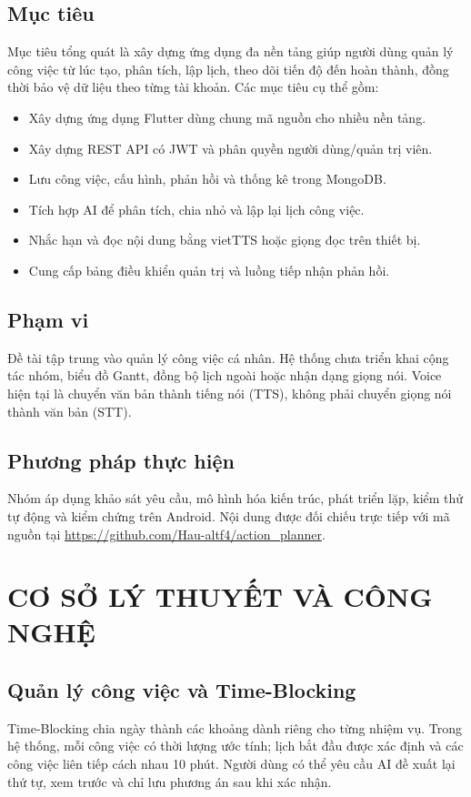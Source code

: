 \documentclass[12pt,a4paper,oneside]{report}
\begin{document}
\section{Mục tiêu}
Mục tiêu tổng quát là xây dựng ứng dụng đa nền tảng giúp người dùng quản lý công việc
từ lúc tạo, phân tích, lập lịch, theo dõi tiến độ đến hoàn thành, đồng thời bảo vệ dữ liệu
theo từng tài khoản. Các mục tiêu cụ thể gồm:
\begin{itemize}
 \item Xây dựng ứng dụng Flutter dùng chung mã nguồn cho nhiều nền tảng.
 \item Xây dựng REST API có JWT và phân quyền người dùng/quản trị viên.
 \item Lưu công việc, cấu hình, phản hồi và thống kê trong MongoDB.
 \item Tích hợp AI để phân tích, chia nhỏ và lập lại lịch công việc.
 \item Nhắc hạn và đọc nội dung bằng vietTTS hoặc giọng đọc trên thiết bị.
 \item Cung cấp bảng điều khiển quản trị và luồng tiếp nhận phản hồi.
\end{itemize}

\section{Phạm vi}
Đề tài tập trung vào quản lý công việc cá nhân. Hệ thống chưa triển khai cộng tác nhóm,
biểu đồ Gantt, đồng bộ lịch ngoài hoặc nhận dạng giọng nói. Voice hiện tại là chuyển văn
bản thành tiếng nói (TTS), không phải chuyển giọng nói thành văn bản (STT).

\section{Phương pháp thực hiện}
Nhóm áp dụng khảo sát yêu cầu, mô hình hóa kiến trúc, phát triển lặp, kiểm thử tự động
và kiểm chứng trên Android. Nội dung được đối chiếu trực tiếp với mã nguồn tại
\url{https://github.com/Hau-altf4/action_planner}.

\chapter{CƠ SỞ LÝ THUYẾT VÀ CÔNG NGHỆ}
\section{Quản lý công việc và Time-Blocking}
Time-Blocking chia ngày thành các khoảng dành riêng cho từng nhiệm vụ. Trong hệ thống,
mỗi công việc có thời lượng ước tính; lịch bắt đầu được xác định và các công việc liên
tiếp cách nhau 10 phút. Người dùng có thể yêu cầu AI đề xuất lại thứ tự, xem trước và
chỉ lưu phương án sau khi xác nhận.
\end{document}
